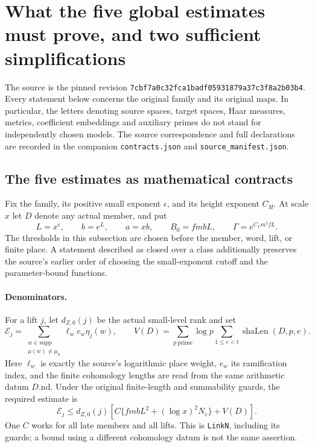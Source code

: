 \section{What the five global estimates must prove, and two sufficient simplifications}
\label{sec:global-quantitative-v042}


The source is the pinned revision
\texttt{7cbf7a0c32fca1badf05931879a37c3f8a2b03b4}.
Every statement below concerns the original family and its original
maps. In particular, the letters denoting source spaces, target spaces,
Haar measures, metrics, coefficient embeddings and auxiliary primes
do not stand for independently chosen models. The source correspondence
and full declarations are recorded in the companion
\texttt{contracts.json} and \texttt{source\_manifest.json}.

\subsection{The five estimates as mathematical contracts}

Fix the family, its positive small exponent $\epsilon$, and its height
exponent $C_H$. At scale $x$ let $D$ denote any actual member, and put
\[
 L=x^\epsilon,\qquad b=e^L,\qquad a=xb,\qquad
 B_0=fmbL,\qquad \Gamma=e^{C_\Gamma m^5fL}.
\]
The thresholds in this subsection are chosen before the member, word,
lift, or finite place. A statement described as closed over a class
additionally preserves the source's earlier order of choosing the
small-exponent cutoff and the parameter-bound functions.

\paragraph{Denominators.}
For a lift $j$, let $d_{Z,0}(j)$ be the actual small-level rank and set
\[
 \mathcal E_j=\sum_{\substack{w\in\mathrm{supp}\\\mu(w)\ne\mu_0}}
       \ell_w e_w\eta_j(w),\qquad
 V(D)=\sum_{p\ \mathrm{prime}}\log p
                 \sum_{1\le e<t}\operatorname{shaLen}(D,p,e).
\]
Here $\ell_w$ is exactly the source's logarithmic place weight, $e_w$
its ramification index, and the finite cohomology lengths are read from
the same arithmetic datum $D.\mathrm{nd}$. Under the original
finite-length and summability guards, the required estimate is
\begin{equation}\label{eq:gqt-denominator}
 \mathcal E_j\le d_{Z,0}(j)
   \left[C\{fmbL^2+(\log x)^2N_c\}+V(D)\right].
\end{equation}
One $C$ works for all late members and all lifts. This is
\texttt{LinkN}, including its guards; a bound using a different
cohomology datum is not the same assertion.

